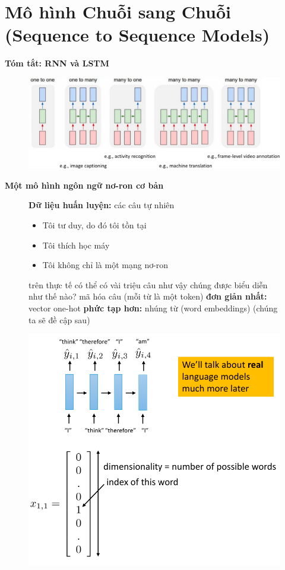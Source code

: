 \documentclass{book}
\begin{document}
\section{Mô hình Chuỗi sang Chuỗi (Sequence to Sequence Models)}
\textbf{Tóm tắt: RNN và LSTM}
\begin{figure}[H]
    \centering
    \includegraphics[width=\textwidth]{images/rnns_and_lstms.png}
\end{figure}
\textbf{Một mô hình ngôn ngữ nơ-ron cơ bản}
\begin{figure}[H]
    \begin{minipage}[c]{0.45\textwidth}
        \textbf{Dữ liệu huấn luyện:} các câu tự nhiên
        \begin{itemize}
            \item[] Tôi tư duy, do đó tôi tồn tại
            \item[] Tôi thích học máy
            \item[] Tôi không chỉ là một mạng nơ-ron
        \end{itemize}
        trên thực tế có thể có vài triệu câu như vậy
        chúng được biểu diễn như thế nào?
        mã hóa câu (mỗi từ là một token)
        \textbf{đơn giản nhất:} vector one-hot
        \textbf{phức tạp hơn:} nhúng từ (word embeddings) (chúng ta sẽ đề cập sau)
    \end{minipage}\hfill
    \begin{minipage}[c]{0.45\textwidth}
        \centering
        \includegraphics[width=\textwidth]{images/a_basic_language_model.png}
    \end{minipage}
\end{figure}
\end{document}

